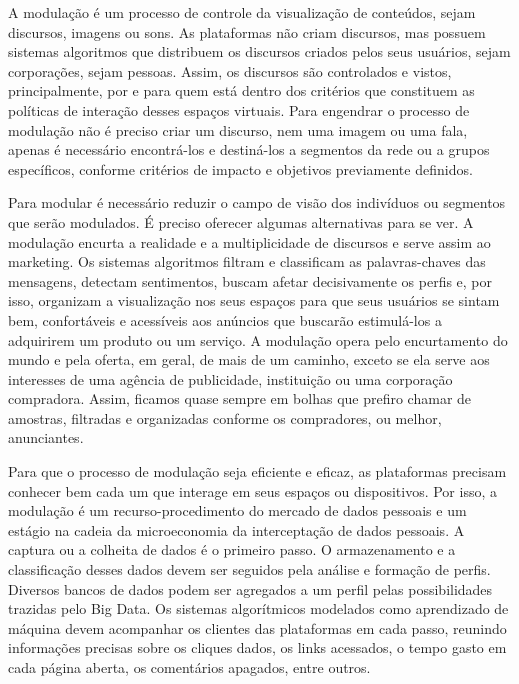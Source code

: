 A modulação é um processo de controle da visualização de conteúdos,
sejam discursos, imagens ou sons. As plataformas não criam discursos,
mas possuem sistemas algoritmos que distribuem os discursos criados
pelos seus usuários, sejam corporações, sejam pessoas. Assim, os
discursos são controlados e vistos, principalmente, por e para quem está
dentro dos critérios que constituem as políticas de interação desses
espaços virtuais. Para engendrar o processo de modulação não é preciso
criar um discurso, nem uma imagem ou uma fala, apenas é necessário
encontrá-los e destiná-los a segmentos da rede ou a grupos específicos,
conforme critérios de impacto e objetivos previamente definidos.

Para modular é necessário reduzir o campo de visão dos indivíduos ou
segmentos que serão modulados. É preciso oferecer algumas alternativas
para se ver. A modulação encurta a realidade e a multiplicidade de
discursos e serve assim ao marketing. Os sistemas algoritmos filtram e
classificam as palavras-chaves das mensagens, detectam sentimentos,
buscam afetar decisivamente os perfis e, por isso, organizam a
visualização nos seus espaços para que seus usuários se sintam bem,
confortáveis e acessíveis aos anúncios que buscarão estimulá-los a
adquirirem um produto ou um serviço. A modulação opera pelo encurtamento
do mundo e pela oferta, em geral, de mais de um caminho, exceto se ela
serve aos interesses de uma agência de publicidade, instituição ou uma
corporação compradora. Assim, ficamos quase sempre em bolhas que prefiro
chamar de amostras, filtradas e organizadas conforme os compradores, ou
melhor, anunciantes.

Para que o processo de modulação seja eficiente e eficaz, as plataformas
precisam conhecer bem cada um que interage em seus espaços ou
dispositivos. Por isso, a modulação é um recurso-procedimento do mercado
de dados pessoais e um estágio na cadeia da microeconomia da
interceptação de dados pessoais. A captura ou a colheita de dados é o
primeiro passo. O armazenamento e a classificação desses dados devem ser
seguidos pela análise e formação de perfis. Diversos bancos de dados
podem ser agregados a um perfil pelas possibilidades trazidas pelo Big
Data. Os sistemas algorítmicos modelados como aprendizado de máquina
devem acompanhar os clientes das plataformas em cada passo, reunindo
informações precisas sobre os cliques dados, os links acessados, o tempo
gasto em cada página aberta, os comentários apagados, entre outros.

